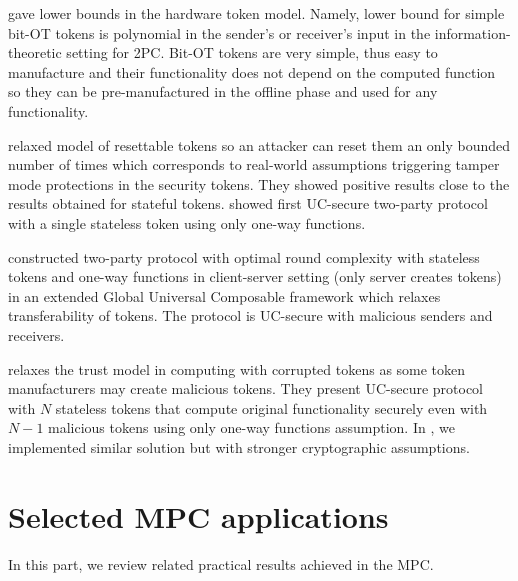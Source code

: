 \documentclass[
  digital, %
  twoside, %
  table,   %
  lof,     %
  lot,     %
]{fithesis3}
\newcounter{ph4_show_guides}
\theoremstyle{definition}
\theoremstyle{remark}
\begin{document}
\cite{AAGPR13} gave lower bounds in the hardware token model. Namely, lower bound for simple bit-OT tokens is polynomial in the sender's or receiver's input in the information-theoretic setting for 2PC. Bit-OT tokens are very simple, thus easy to manufacture and their functionality does not depend on the computed function so they can be pre-manufactured in the offline phase and used for any functionality.

\cite{DKMN15} relaxed model of resettable tokens so an attacker can reset them an only bounded number of times which corresponds to real-world assumptions triggering tamper mode protections in the security tokens. They showed positive results close to the results obtained for stateful tokens. \cite{DKMN15b} showed first UC-secure two-party protocol with a single stateless token using only one-way functions.

\cite{HPV16} constructed two-party protocol with optimal round complexity with stateless tokens and one-way functions in client-server setting (only server creates tokens) in an extended Global Universal Composable framework which relaxes transferability of tokens. The protocol is UC-secure with malicious senders and receivers.

\cite{CCOV17} relaxes the trust model in computing with corrupted tokens as some token manufacturers may create malicious tokens. They present UC-secure protocol with $N$ stateless tokens that compute original functionality securely even with $N-1$ malicious tokens using only one-way functions assumption. In \cite{2017-ccs-mavroudis}, we implemented similar solution but with stronger cryptographic assumptions.


\section{Selected MPC applications}\label{sec:soa:applications}
%
In this part, we review related practical results achieved in the MPC.

\end{document}
